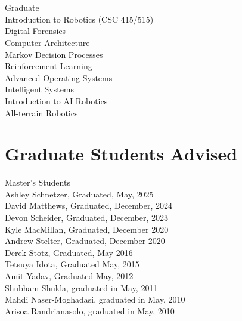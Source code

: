 \documentclass[12pt,letter]{resume}
\begin{document}
\section{}{Graduate}
{\\
  \hspace*{1em} Introduction to Robotics (CSC 415/515)\\
\hspace*{1em} Digital Forensics\\
\hspace*{1em} Computer Architecture\\
\hspace*{1em} Markov Decision Processes\\
\hspace*{1em} Reinforcement Learning\\
\hspace*{1em} Advanced Operating Systems\\
\hspace*{1em} Intelligent Systems\\
\hspace*{1em} Introduction to AI Robotics\\
\hspace*{1em} All-terrain Robotics
}


\section{Graduate Students Advised}{Master's Students}
        {\\
          Ashley Schnetzer, Graduated, May, 2025\\
          David Matthews, Graduated, December, 2024\\
          Devon Scheider, Graduated, December, 2023\\
  Kyle MacMillan, Graduated, December 2020\\
  Andrew Stelter, Graduated, December 2020\\
  Derek Stotz, Graduated, May 2016\\
  Tetsuya Idota, Graduated May, 2015\\
  Amit Yadav, Graduated May, 2012\\
  Shubham Shukla, graduated in May, 2011\\
  Mahdi Naser-Moghadasi, graduated in May, 2010\\
  Arisoa Randrianasolo, graduated in May, 2010\\
            }

        
\end{document}
